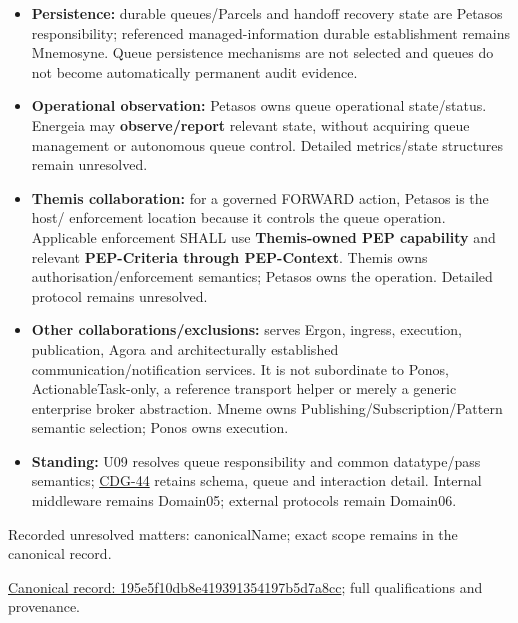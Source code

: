 \begin{itemize}


\item \textbf{Persistence:} durable queues/Parcels and handoff recovery state are Petasos
  responsibility; referenced managed-information durable establishment remains
  Mnemosyne. Queue persistence mechanisms are not selected and queues do not
  become automatically permanent audit evidence.

\item \textbf{Operational observation:} Petasos owns queue operational state/status.
  Energeia may \textbf{observe/report} relevant state, without acquiring queue management
  or autonomous queue control. Detailed metrics/state structures remain unresolved.

\item \textbf{Themis collaboration:} for a governed FORWARD action, Petasos is the host/
  enforcement location because it controls the queue operation. Applicable
  enforcement SHALL use \textbf{Themis-owned PEP capability} and relevant \textbf{PEP-Criteria through PEP-Context}. Themis owns authorisation/enforcement semantics; Petasos owns the
  operation. Detailed protocol remains unresolved.

\item \textbf{Other collaborations/exclusions:} serves Ergon, ingress, execution,
  publication, Agora and architecturally established communication/notification
  services. It is not subordinate to Ponos, ActionableTask-only, a reference
  transport helper or merely a generic enterprise broker abstraction. Mneme owns
  Publishing/Subscription/Pattern semantic selection; Ponos owns execution.

\item \textbf{Standing:} U09 resolves queue responsibility and common datatype/pass semantics;
  \href{\detokenize{../../../../../docs/markdown/05-information-systems-architecture/gaps.md#petasos-detailed-contracts}}{CDG-44} retains schema, queue and interaction
  detail. Internal middleware remains Domain05; external protocols remain Domain06.

\end{itemize}

{\small Recorded unresolved matters: canonicalName; exact scope remains in the canonical record.}\par
{\footnotesize \href{../../../../continuum/application/application-component/195e5f10db8e419391354197b5d7a8cc.md}{Canonical record: 195e5f10db8e419391354197b5d7a8cc}; full qualifications and provenance.}\par

